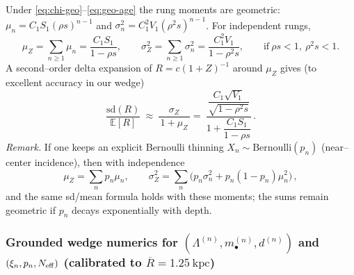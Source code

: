 \documentclass[10pt]{article}
\theoremstyle{definition}
\theoremstyle{plain}
\begin{document}
Under \eqref{eq:chi-geo}–\eqref{eq:geo-age} the rung moments are geometric: $\mu_n=C_1 S_1 (\rho s)^{n-1}$ and $\sigma_n^2=C_1^2 V_1 (\rho^2 s)^{n-1}$. For independent rungs,
\begin{equation}
\mu_Z=\sum_{n\ge 1}\mu_n=\frac{C_1S_1}{1-\rho s},\qquad
\sigma_Z^2=\sum_{n\ge 1}\sigma_n^2=\frac{C_1^2V_1}{1-\rho^2 s},
\qquad \text{if}\ \rho s<1,\ \rho^2 s<1.
\label{eq:muZ-sigZ}
\end{equation}
A second–order delta expansion of $R=c(1+Z)^{-1}$ around $\mu_Z$ gives (to excellent accuracy in our wedge)
\begin{equation}
\boxed{\qquad
\frac{\mathrm{sd}(R)}{\mathbb E[R]}\ \approx\ \frac{\sigma_Z}{\,1+\mu_Z\,}
=\ \frac{ \dfrac{C_1\sqrt{V_1}}{\sqrt{1-\rho^2 s}} }{ 1+\dfrac{C_1 S_1}{1-\rho s} }\,.
\qquad}
\label{eq:sd-over-mean-unified}
\end{equation}
\emph{Remark.} If one keeps an explicit Bernoulli thinning $X_n\sim\mathrm{Bernoulli}(p_n)$ (near–center incidence), then with independence
\[
\mu_Z=\sum_n p_n \mu_n,\qquad
\sigma_Z^2=\sum_n \big(p_n \sigma_n^2 + p_n(1-p_n)\mu_n^2\big)\,,
\]
and the same sd/mean formula holds with these moments; the sums remain geometric if $p_n$ decays exponentially with depth.

\subsubsection*{\texorpdfstring{Grounded wedge numerics for $(\Lambda^{(n)},m_\bullet^{(n)},d^{(n)})$ and $(\xi_n,p_n,N_{\rm eff})$ (calibrated to $\overline{R}=1.25~\mathrm{kpc}$)}{Grounded wedge numerics for (Lambda^(n),m_bullet^(n),d^(n)) and (xi_n,p_n,N_eff) (calibrated to Rbar=1.25 kpc)}}
\label{subsubsec:wedge-numerics}
\end{document}
